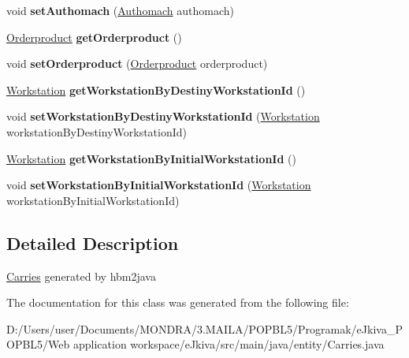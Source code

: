 \begin{DoxyCompactItemize}
\mbox{\label{classentity_1_1_carries_a5fddad71e78d3206116e710916c8bb74}} 
void {\bfseries set\+Authomach} (\mbox{\hyperlink{classentity_1_1_authomach}{Authomach}} authomach)
\item 
\mbox{\label{classentity_1_1_carries_a6439c3d458849f3f5d87c0f9577fc16b}} 
\mbox{\hyperlink{classentity_1_1_orderproduct}{Orderproduct}} {\bfseries get\+Orderproduct} ()
\item 
\mbox{\label{classentity_1_1_carries_af3856ed5dc8866063ed552e5a6289736}} 
void {\bfseries set\+Orderproduct} (\mbox{\hyperlink{classentity_1_1_orderproduct}{Orderproduct}} orderproduct)
\item 
\mbox{\label{classentity_1_1_carries_a13e9ee65fee8f33abd1b5fcd4da046c2}} 
\mbox{\hyperlink{classentity_1_1_workstation}{Workstation}} {\bfseries get\+Workstation\+By\+Destiny\+Workstation\+Id} ()
\item 
\mbox{\label{classentity_1_1_carries_a97c1c2cb313a25a61f86e538345ae58f}} 
void {\bfseries set\+Workstation\+By\+Destiny\+Workstation\+Id} (\mbox{\hyperlink{classentity_1_1_workstation}{Workstation}} workstation\+By\+Destiny\+Workstation\+Id)
\item 
\mbox{\label{classentity_1_1_carries_a4d75d589a3902ef133f3be58d725b852}} 
\mbox{\hyperlink{classentity_1_1_workstation}{Workstation}} {\bfseries get\+Workstation\+By\+Initial\+Workstation\+Id} ()
\item 
\mbox{\label{classentity_1_1_carries_a807fe564289f14063a30047d3cea3522}} 
void {\bfseries set\+Workstation\+By\+Initial\+Workstation\+Id} (\mbox{\hyperlink{classentity_1_1_workstation}{Workstation}} workstation\+By\+Initial\+Workstation\+Id)
\end{DoxyCompactItemize}


\subsection{Detailed Description}
\mbox{\hyperlink{classentity_1_1_carries}{Carries}} generated by hbm2java 

The documentation for this class was generated from the following file\+:\begin{DoxyCompactItemize}
\item 
D\+:/\+Users/user/\+Documents/\+M\+O\+N\+D\+R\+A/3.\+M\+A\+I\+L\+A/\+P\+O\+P\+B\+L5/\+Programak/e\+Jkiva\+\_\+\+P\+O\+P\+B\+L5/\+Web application workspace/e\+Jkiva/src/main/java/entity/Carries.\+java\end{DoxyCompactItemize}
